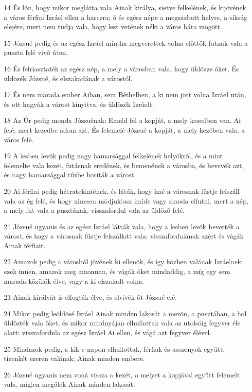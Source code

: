 \par 14 És lõn, hogy mikor meglátta vala Ainak királya, sietve felkelének, és kijövének a város férfiai Izráel ellen a harczra; õ és egész népe a megszabott helyre, a síkság elejére, mert nem tudja vala, hogy lest vetének néki a város háta mögött.
\par 15 Józsué pedig és az egész Izráel mintha megverettek volna elõttök futnak vala a puszta felé vivõ úton.
\par 16 És felriasztaték az egész nép, a mely a városban vala, hogy üldözze õket. És üldözék Józsué, és elszakadának a várostól.
\par 17 És nem marada ember Aiban, sem Béthelben, a ki nem jött volna Izráel után, és ott hagyák a várost kinyitva, és üldözék Izráelt.
\par 18 Az Úr pedig monda Józsuénak: Emeld fel a kopját, a mely kezedben van, Ai felé, mert kezedbe adom azt. És felemelé Józsué a kopját, a mely kezében vala, a város felé.
\par 19 A lesben levõk pedig nagy hamarsággal felkelének helyökrõl, és a mint felemelte vala kezét, futásnak eredének, és bemenének a városba, és bevevék azt, és nagy hamarsággal tûzbe boríták a várost.
\par 20 Ai férfiai pedig hátratekintének, és láták, hogy ímé a városnak füstje felszáll vala az ég felé, és hogy nincsen módjukban imide vagy amoda elfutni, mert a nép, a mely fut vala a pusztának, visszafordul vala az üldözõ felé.
\par 21 Józsué ugyanis és az egész Izráel látták vala, hogy a lesben levõk bevették a várost, és hogy a városnak füstje felszállott vala: visszafordulának azért és vágák Ainak férfiait.
\par 22 Amazok pedig a városból jövének ki ellenök, és így közben valának Izráelnek: ezek innen, amazok meg amonnan, és vágák õket mindaddig, a míg egy sem marada közülök  élve, vagy a ki elszaladt volna.
\par 23 Ainak királyát is elfogták élve, és elvivék õt Józsué elé.
\par 24 Mikor pedig leöldösé Izráel Ainak minden lakosát a mezõn, a pusztában, a hol üldözték vala õket, és mikor mindnyájan elhullottak vala az utolsóig fegyver éle alatt: visszafordula az egész Izráel Ai ellen, és vágá azt fegyver élével.
\par 25 Mindazok pedig, a kik e napon elhullottak, férfiak és asszonyok együtt, tizenkét ezeren valának; Ainak minden embere.
\par 26 Józsué ugyanis nem voná vissza a kezét, a melyet a kopjával együtt felemelt vala, míglen megölék Ainak minden lakosát.
